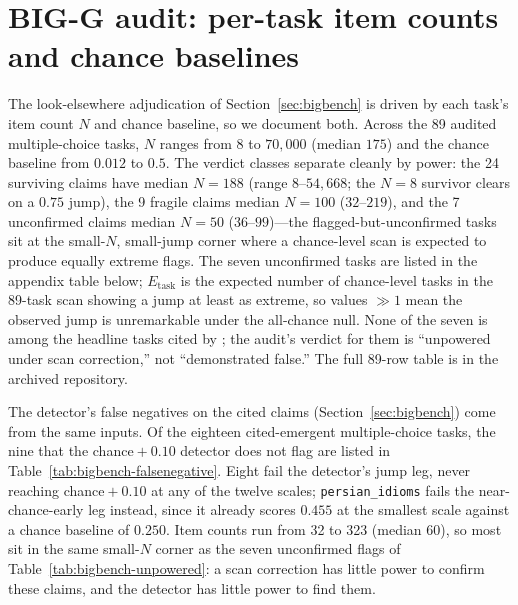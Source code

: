 \documentclass[11pt]{article}
\theoremstyle{plain}
\theoremstyle{definition}
\begin{document}
\section{BIG-G audit: per-task item counts and chance baselines}\label{app:bigbench}
\setcounter{table}{0}
\renewcommand{\theHtable}{B\arabic{table}}

The look-elsewhere adjudication of Section~\ref{sec:bigbench} is driven by each task's
item count $N$ and chance baseline, so we document both. Across the 89 audited
multiple-choice tasks, $N$ ranges from $8$ to $70{,}000$ (median $175$) and the chance
baseline from $0.012$ to $0.5$. The verdict classes separate cleanly by power: the 24
surviving claims have median $N=188$ (range $8$--$54{,}668$; the $N{=}8$ survivor clears
on a $0.75$ jump), the 9 fragile claims median $N=100$ ($32$--$219$), and the 7
unconfirmed claims median $N=50$ ($36$--$99$)---the flagged-but-unconfirmed tasks sit at
the small-$N$, small-jump corner where a chance-level scan is expected to produce
equally extreme flags. The seven unconfirmed tasks are listed in the appendix table below;
$E_{\mathrm{task}}$ is the expected number of chance-level tasks in the 89-task scan
showing a jump at least as extreme, so values $\gg1$ mean the observed jump is
unremarkable under the all-chance null. None of the seven is among the headline tasks
cited by \citet{wei2022emergent}; the audit's verdict for them is ``unpowered under
scan correction,'' not ``demonstrated false.'' The full 89-row table is in the archived
repository.

The detector's false negatives on the cited claims (Section~\ref{sec:bigbench}) come from
the same inputs. Of the eighteen cited-emergent multiple-choice tasks, the nine that the
chance${}+0.10$ detector does not flag are listed in
Table~\ref{tab:bigbench-falsenegative}. Eight fail the detector's jump leg, never reaching
chance${}+0.10$ at any of the twelve scales; \texttt{persian\_idioms} fails the
near-chance-early leg instead, since it already scores $0.455$ at the smallest scale
against a chance baseline of $0.250$. Item counts run from 32 to 323 (median 60), so most
sit in the same small-$N$ corner as the seven unconfirmed flags of
Table~\ref{tab:bigbench-unpowered}: a scan correction has little power to confirm these
claims, and the detector has little power to find them.
\end{document}
